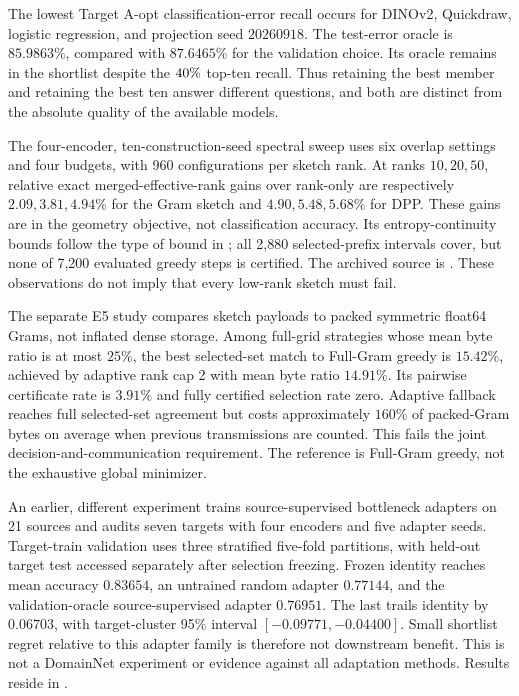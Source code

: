 The lowest Target A-opt classification-error recall occurs for DINOv2, Quickdraw, logistic regression, and projection seed $20260918$. The test-error oracle is $85.9863\%$, compared with $87.6465\%$ for the validation choice. Its oracle remains in the shortlist despite the $40\%$ top-ten recall. Thus retaining the best member and retaining the best ten answer different questions, and both are distinct from the absolute quality of the available models.

The four-encoder, ten-construction-seed spectral sweep uses six overlap settings and four budgets, with 960 configurations per sketch rank. At ranks $10,20,50$, relative exact merged-effective-rank gains over rank-only are respectively $2.09,3.81,4.94\%$ for the Gram sketch and $4.90,5.48,5.68\%$ for DPP. These gains are in the geometry objective, not classification accuracy. Its entropy-continuity bounds follow the type of bound in \citet{audenaert2007}; all 2,880 selected-prefix intervals cover, but none of 7,200 evaluated greedy steps is certified. The archived source is . These observations do not imply that every low-rank sketch must fail.

The separate E5 study compares sketch payloads to packed symmetric float64 Grams, not inflated dense storage. Among full-grid strategies whose mean byte ratio is at most $25\%$, the best selected-set match to Full-Gram greedy is $15.42\%$, achieved by adaptive rank cap 2 with mean byte ratio $14.91\%$. Its pairwise certificate rate is $3.91\%$ and fully certified selection rate zero. Adaptive fallback reaches full selected-set agreement but costs approximately $160\%$ of packed-Gram bytes on average when previous transmissions are counted. This fails the joint decision-and-communication requirement. The reference is Full-Gram greedy, not the exhaustive global minimizer.

An earlier, different experiment trains source-supervised bottleneck adapters on 21 sources and audits seven targets with four encoders and five adapter seeds. Target-train validation uses three stratified five-fold partitions, with held-out target test accessed separately after selection freezing. Frozen identity reaches mean accuracy $0.83654$, an untrained random adapter $0.77144$, and the validation-oracle source-supervised adapter $0.76951$. The last trails identity by $0.06703$, with target-cluster 95\% interval $[-0.09771,-0.04400]$. Small shortlist regret relative to this adapter family is therefore not downstream benefit. This is not a DomainNet experiment or evidence against all adaptation methods. Results reside in .

